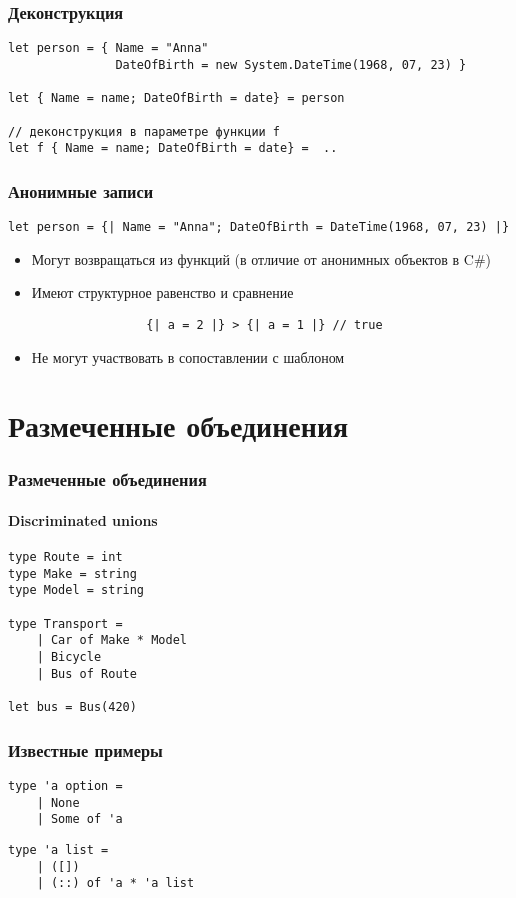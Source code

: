 \documentclass{../../slides-style}
\begin{document}
    \begin{frame}[fragile]
        \frametitle{Деконструкция}
        \begin{verbatim}
let person = { Name = "Anna"
               DateOfBirth = new System.DateTime(1968, 07, 23) }

let { Name = name; DateOfBirth = date} = person

// деконструкция в параметре функции f
let f { Name = name; DateOfBirth = date} =  ..
        \end{verbatim}
    \end{frame}

    \begin{frame}[fragile]
        \frametitle{Анонимные записи}
        \begin{verbatim}
let person = {| Name = "Anna"; DateOfBirth = DateTime(1968, 07, 23) |}
        \end{verbatim}
        \begin{itemize}
            \item Могут возвращаться из функций (в отличие от анонимных объектов в C\#)
            \item Имеют структурное равенство и сравнение
                \begin{verbatim}
                {| a = 2 |} > {| a = 1 |} // true
                \end{verbatim}
            \item Не могут участвовать в сопоставлении с шаблоном
        \end{itemize}
    \end{frame}

    \section{Размеченные объединения}
    
    \begin{frame}[fragile]
        \frametitle{Размеченные объединения}
        \framesubtitle{Discriminated unions}
        \begin{verbatim}
type Route = int
type Make = string
type Model = string

type Transport =
    | Car of Make * Model
    | Bicycle
    | Bus of Route

let bus = Bus(420)
        \end{verbatim}
    \end{frame}

    \begin{frame}[fragile]
        \frametitle{Известные примеры}
        \begin{verbatim}
type 'a option =
    | None
    | Some of 'a
        \end{verbatim}

        \vspace{5mm}
        \begin{verbatim}
type 'a list =
    | ([])
    | (::) of 'a * 'a list
        \end{verbatim}
    \end{frame}
\end{document}
